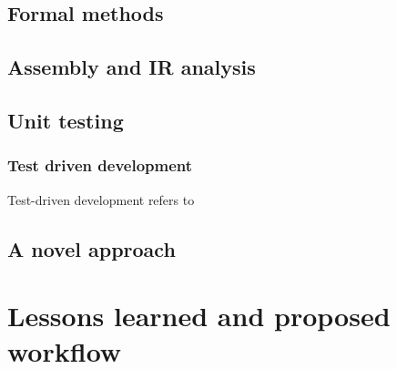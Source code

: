 \subsection{Formal methods}
\label{sec:equivalence-end-to-end}

\subsection{Assembly and IR analysis}
\label{sec:equivalence-end-to-end}

\subsection{Unit testing}
\label{sec:equivalence-unit-testing}

\subsubsection{Test driven development}
\label{sec:equivalence-tdd}

Test-driven development refers to


\subsection{A novel approach}
\label{sec:equivalence-polyglotest}





\section{Lessons learned and proposed workflow}
\label{sec:translation-workflow} %